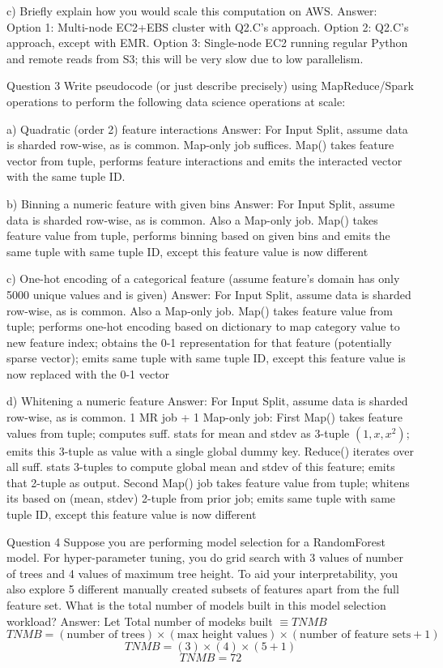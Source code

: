   c) Briefly explain how you would scale this computation on AWS.
    Answer:
    Option 1: Multi-node EC2+EBS cluster with Q2.C's approach. 
    Option 2: Q2.C's approach, except with EMR. 
    Option 3: Single-node EC2 running regular Python and remote reads from S3; this will be very slow due to low parallelism.

  Question 3
  Write pseudocode (or just describe precisely) using MapReduce/Spark operations to perform the following data science operations at scale:

  a) Quadratic (order 2) feature interactions 
    Answer:
    For Input Split, assume data is sharded row-wise, as is common.
    Map-only job suffices. Map() takes feature vector from tuple, performs feature interactions and emits the interacted vector with the same tuple ID.

  b) Binning a numeric feature with given bins 
    Answer:
    For Input Split, assume data is sharded row-wise, as is common.
    Also a Map-only job. Map() takes feature value from tuple, performs binning based on given bins and emits the same tuple with same tuple ID, except this feature value is now different

  c) One-hot encoding of a categorical feature (assume feature's domain has only 5000 unique values and is given) 
    Answer:
    For Input Split, assume data is sharded row-wise, as is common.
    Also a Map-only job. Map() takes feature value from tuple; performs one-hot encoding based on dictionary to map category value to new feature index; obtains the 0-1 representation for that feature (potentially sparse vector); emits same tuple with same tuple ID, except this feature value is now replaced with the 0-1 vector

  d) Whitening a numeric feature 
    Answer:
    For Input Split, assume data is sharded row-wise, as is common. 
    1 MR job + 1 Map-only job: 
    First Map() takes feature values from tuple; computes suff. stats for mean and stdev as 3-tuple $(1, x, x^2)$; emits this 3-tuple as value with a single global dummy key. 
    Reduce() iterates over all suff. stats 3-tuples to compute global mean and stdev of this feature; emits that 2-tuple as output. 
    Second Map() job takes feature value from tuple; whitens its based on (mean, stdev) 2-tuple from prior job; emits same tuple with same tuple ID, except this feature value is now different

  Question 4
  Suppose you are performing model selection for a RandomForest model. For hyper-parameter tuning, you do grid search with 3 values of number of trees and 4 values of maximum tree height. To aid your interpretability, you also explore 5 different manually created subsets of features apart from the full feature set. What is the total number of models built in this model selection workload? 
  Answer:
  Let Total number of modeks built $\equiv TNMB$
  $$TNMB = (\text{number of trees}) \times (\text{max height values}) \times (\text{number of feature sets}+1)$$
  $$TNMB = (3) \times (4) \times (5+1)$$
  $$TNMB = 72 $$
  

